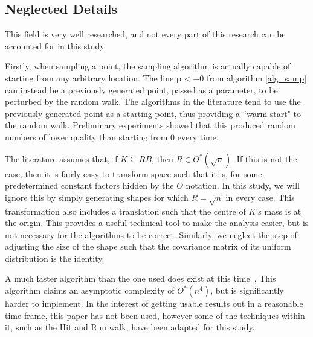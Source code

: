 \subsection{Neglected Details}

This field is very well researched, and not every part of this research can be accounted for in this study.

Firstly, when sampling a point, the sampling algorithm is actually capable of starting from any arbitrary location. The line ${\bm p} <- 0$ from algorithm \ref{alg_samp} can instead be a previously generated point, passed as a parameter, to be perturbed by the random walk. The algorithms in the literature tend to use the previously generated point as a starting point, thus providing a ``warm start" to the random walk. Preliminary experiments showed that this produced random numbers of lower quality than starting from $0$ every time.

The literature assumes that, if $K \subseteq RB$, then $R \in O^{*}(\sqrt{n})$. If this is not the case, then it is fairly easy to transform space such that it is, for some predetermined constant factors hidden by the $O$ notation. In this study, we will ignore this by simply generating shapes for which $R = \sqrt{n}$ in every case. This transformation also includes a translation such that the centre of $K$'s mass is at the origin. This provides a useful technical tool to make the analysis easier, but is not necessary for the algorithms to be correct. Similarly, we neglect the step of adjusting the size of the shape such that the covariance matrix of its uniform distribution is the identity.

A much faster algorithm than the one used does exist at this time~\cite{Lovasz03}. This algorithm claims an asymptotic complexity of $O^{*}(n^4)$, but is significantly harder to implement. In the interest of getting usable results out in a reasonable time frame, this paper has not been used, however some of the techniques within it, such as the Hit and Run walk, have been adapted for this study.